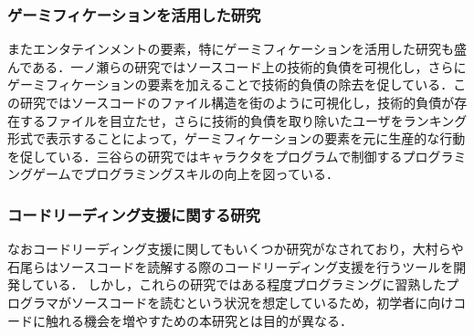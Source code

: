 \subsubsection{ゲーミフィケーションを活用した研究}
またエンタテインメントの要素，特にゲーミフィケーションを活用した研究も盛んである．一ノ瀬らの研究\cite{ichinose}ではソースコード上の技術的負債を可視化し，さらにゲーミフィケーションの要素を加えることで技術的負債の除去を促している．この研究ではソースコードのファイル構造を街のように可視化し，技術的負債が存在するファイルを目立たせ，さらに技術的負債を取り除いたユーザをランキング形式で表示することによって，ゲーミフィケーションの要素を元に生産的な行動を促している．三谷らの研究ではキャラクタをプログラムで制御するプログラミングゲームでプログラミングスキルの向上を図っている\cite{mitani}．

\subsubsection{コードリーディング支援に関する研究}
なおコードリーディング支援に関してもいくつか研究がなされており，大村らや石尾らはソースコードを読解する際のコードリーディング支援を行うツールを開発している\cite{omura}\cite{ishio}．
しかし，これらの研究ではある程度プログラミングに習熟したプログラマがソースコードを読むという状況を想定しているため，初学者に向けコードに触れる機会を増やすための本研究とは目的が異なる．

